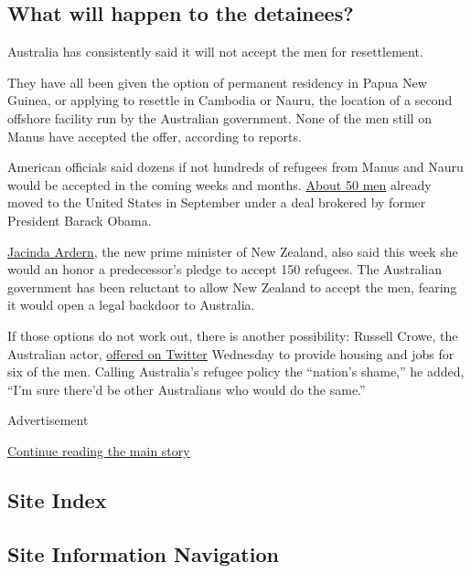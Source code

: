 \hypertarget{what-will-happen-to-the-detainees}{%
\subsection{What will happen to the
detainees?}\label{what-will-happen-to-the-detainees}}

Australia has consistently said it will not accept the men for
resettlement.

They have all been given the option of permanent residency in Papua New
Guinea, or applying to resettle in Cambodia or Nauru, the location of a
second offshore facility run by the Australian government. None of the
men still on Manus have accepted the offer, according to reports.

American officials said dozens if not hundreds of refugees from Manus
and Nauru would be accepted in the coming weeks and months.
\href{https://www.nytimes.com/2017/09/20/world/australia/refugees-turnbull-trump.html}{About
50 men} already moved to the United States in September under a deal
brokered by former President Barack Obama.

\href{https://www.nytimes.com/2017/10/20/world/asia/jacinda-ardern-new-zealand.html?_r=0}{Jacinda
Ardern}, the new prime minister of New Zealand, also said this week she
would an honor a predecessor's pledge to accept 150 refugees. The
Australian government has been reluctant to allow New Zealand to accept
the men, fearing it would open a legal backdoor to Australia.

If those options do not work out, there is another possibility: Russell
Crowe, the Australian actor,
\href{https://twitter.com/russellcrowe/status/925660477371269120}{offered
on Twitter} Wednesday to provide housing and jobs for six of the men.
Calling Australia's refugee policy the ``nation's shame,'' he added,
``I'm sure there'd be other Australians who would do the same.''

Advertisement

\protect\hyperlink{after-bottom}{Continue reading the main story}

\hypertarget{site-index}{%
\subsection{Site Index}\label{site-index}}

\hypertarget{site-information-navigation}{%
\subsection{Site Information
Navigation}\label{site-information-navigation}}

